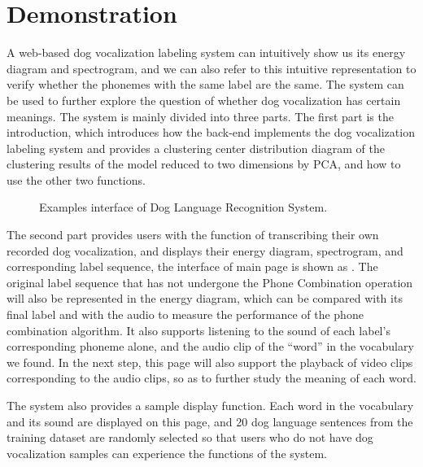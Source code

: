 \section{Demonstration}

A web-based dog vocalization labeling system can intuitively show us its energy diagram and spectrogram, and we can also refer to this intuitive representation to verify whether the phonemes with the same label are the same. The system can be used to further explore the question of whether dog vocalization has certain meanings. The system is mainly divided into three parts. The first part is the introduction, which introduces how the back-end implements the dog vocalization labeling system and provides a clustering center distribution diagram of the clustering results of the model reduced to two dimensions by PCA, and how to use the other two functions.

\begin{figure}[h]
    \centering
    \caption{Examples interface of Dog Language Recognition System.}
    \label{fig:demo1}
\end{figure}

The second part provides users with the function of transcribing their own recorded dog vocalization, and displays their energy diagram, spectrogram, and corresponding label sequence, the interface of main page is shown as . The original label sequence that has not undergone the Phone Combination operation will also be represented in the energy diagram, which can be compared with its final label and with the audio to measure the performance of the phone combination algorithm. It also supports listening to the sound of each label's corresponding phoneme alone, and the audio clip of the ``word'' in the vocabulary we found. In the next step, this page will also support the playback of video clips corresponding to the audio clips, so as to further study the meaning of each word.

The system also provides a sample display function. Each word in the vocabulary and its sound are displayed on this page, and 20 dog language sentences from the training dataset are randomly selected so that users who do not have dog vocalization samples can experience the functions of the system.